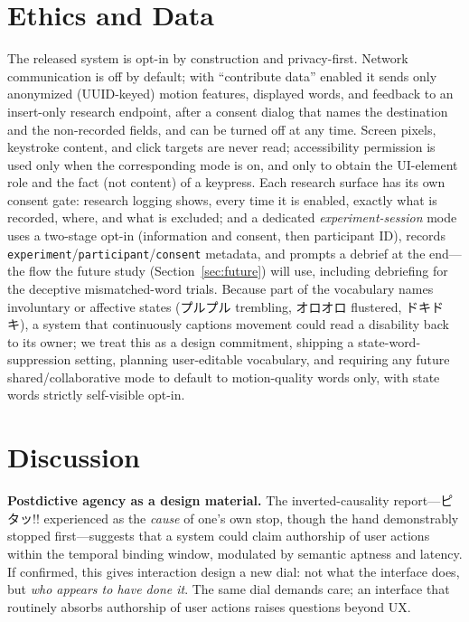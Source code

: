 \documentclass[sigconf,nonacm]{acmart}
\newcommand{\jp}[1]{#1}
\begin{document}
\section{Ethics and Data}
\label{sec:ethics}

The released system is opt-in by construction and privacy-first. Network communication is off by default; with ``contribute data'' enabled it sends only anonymized (UUID-keyed) motion features, displayed words, and feedback to an insert-only research endpoint, after a consent dialog that names the destination and the non-recorded fields, and can be turned off at any time. Screen pixels, keystroke content, and click targets are never read; accessibility permission is used only when the corresponding mode is on, and only to obtain the UI-element role and the fact (not content) of a keypress. Each research surface has its own consent gate: research logging shows, every time it is enabled, exactly what is recorded, where, and what is excluded; and a dedicated \emph{experiment-session} mode uses a two-stage opt-in (information and consent, then participant ID), records \texttt{experiment}/\texttt{participant}/\texttt{consent} metadata, and prompts a debrief at the end---the flow the future study (Section~\ref{sec:future}) will use, including debriefing for the deceptive mismatched-word trials. Because part of the vocabulary names involuntary or affective states (\jp{プルプル} trembling, \jp{オロオロ} flustered, \jp{ドキドキ}), a system that continuously captions movement could read a disability back to its owner; we treat this as a design commitment, shipping a state-word-suppression setting, planning user-editable vocabulary, and requiring any future shared/collaborative mode to default to motion-quality words only, with state words strictly self-visible opt-in.

\section{Discussion}
\label{sec:discussion}

\textbf{Postdictive agency as a design material.} The inverted-causality report---\jp{ピタッ!!} experienced as the \emph{cause} of one's own stop, though the hand demonstrably stopped first---suggests that a system could claim authorship of user actions within the temporal binding window, modulated by semantic aptness and latency. If confirmed, this gives interaction design a new dial: not what the interface does, but \emph{who appears to have done it}. The same dial demands care; an interface that routinely absorbs authorship of user actions raises questions beyond UX.
\end{document}
